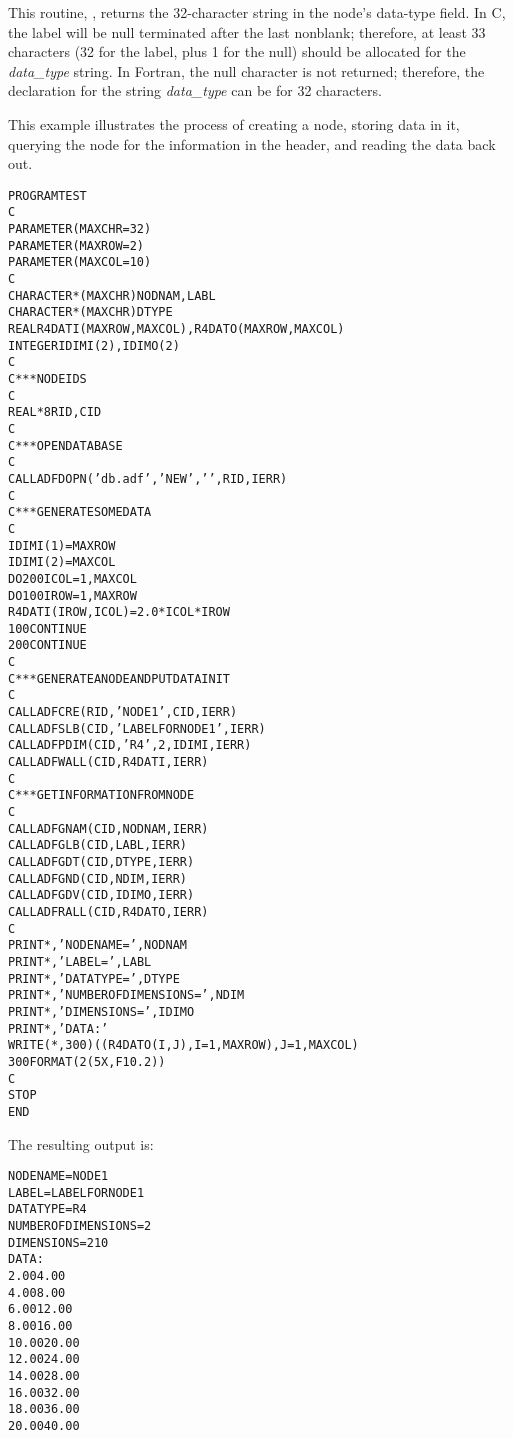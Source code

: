 This routine, , returns the 32-character
string in the node's data-type field.
In C, the label will be null terminated after the last nonblank;
therefore, at least 33 characters (32 for the label, plus 1 for the
null) should be allocated for the \textit{data\_type} string.
In Fortran, the null character is not returned; therefore, the
declaration for the string \textit{data\_type} can be for 32
characters.

\hypertarget{ex:Get\_Data\_Type}{}
\Example

This example illustrates the process of creating a node, storing data in
it, querying the node for the information in the header, and reading the
data back out.

\begin{alltt}
   PROGRAM TEST
   C
         PARAMETER (MAXCHR=32)
         PARAMETER (MAXROW=2)
         PARAMETER (MAXCOL=10)
   C
         CHARACTER*(MAXCHR) NODNAM,LABL
         CHARACTER*(MAXCHR) DTYPE
         REAL R4DATI(MAXROW,MAXCOL),R4DATO(MAXROW,MAXCOL)
         INTEGER IDIMI(2),IDIMO(2)
   C
   C *** NODE IDS
   C
         REAL*8 RID,CID
   C
   C *** OPEN DATABASE
   C
         CALL ADFDOPN('db.adf','NEW',' ',RID,IERR)
   C
   C *** GENERATE SOME DATA
   C
         IDIMI(1) = MAXROW
         IDIMI(2) = MAXCOL
         DO 200 ICOL = 1,MAXCOL
            DO 100 IROW = 1,MAXROW
               R4DATI(IROW,ICOL) = 2.0*ICOL*IROW
     100    CONTINUE
     200 CONTINUE
   C
   C *** GENERATE A NODE AND PUT DATA IN IT
   C
         CALL ADFCRE(RID,'NODE 1',CID,IERR)
         CALL ADFSLB(CID,'LABEL FOR NODE 1',IERR)
         CALL ADFPDIM(CID,'R4',2,IDIMI,IERR)
         CALL ADFWALL(CID,R4DATI,IERR)
   C
   C *** GET INFORMATION FROM NODE
   C
         CALL ADFGNAM(CID,NODNAM,IERR)
         CALL ADFGLB(CID,LABL,IERR)
         CALL ADFGDT(CID,DTYPE,IERR)
         CALL ADFGND(CID,NDIM,IERR)
         CALL ADFGDV(CID,IDIMO,IERR)
         CALL ADFRALL(CID,R4DATO,IERR)
   C
         PRINT *,' NODE NAME            = ',NODNAM
         PRINT *,' LABEL                = ',LABL
         PRINT *,' DATA TYPE            = ',DTYPE
         PRINT *,' NUMBER OF DIMENSIONS = ',NDIM
         PRINT *,' DIMENSIONS           = ',IDIMO
         PRINT *,' DATA:'
         WRITE(*,300)((R4DATO(I,J),I=1,MAXROW),J=1,MAXCOL)
     300 FORMAT(2(5X,F10.2))
   C
         STOP
         END
\end{alltt}

\noindent
The resulting output is:

\begin{alltt}
   NODE NAME            = NODE 1
   LABEL                = LABEL FOR NODE 1
   DATA TYPE            = R4
   NUMBER OF DIMENSIONS =            2
   DIMENSIONS           =            2           10
   DATA:
            2.00           4.00
            4.00           8.00
            6.00          12.00
            8.00          16.00
           10.00          20.00
           12.00          24.00
           14.00          28.00
           16.00          32.00
           18.00          36.00
           20.00          40.00
\end{alltt}

